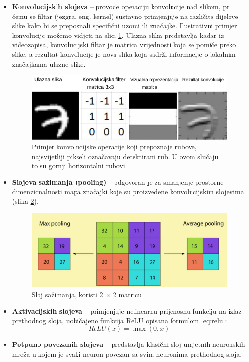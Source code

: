 \documentclass[zavrsnirad]{fer}
\begin{document}
\begin{itemize}
  \item \textbf{Konvolucijskih slojeva} – provode operaciju konvolucije nad slikom, pri čemu se filtar (jezgra, eng. kernel) sustavno primjenjuje na različite dijelove slike kako bi se prepoznali specifični uzorci ili značajke. Ilustrativni primjer konvolucije možemo vidjeti na slici \ref{fig:cnn}. 
Ulazna slika predstavlja kadar iz videozapisa, konvolucijski filtar je matrica vrijednosti koja se pomiče preko slike, a rezultat konvolucije je nova slika koja sadrži informacije o lokalnim značajkama ulazne slike.
  \begin{figure}[H]
    \centering
    \includegraphics[width=\textwidth]{Figures/convolution.png}
    \caption{Primjer konvolucijske operacije koji prepoznaje rubove, najsvijetliji pikseli označavaju detektirani rub. U ovom slučaju to su gornji horizontalni rubovi \cite{deeplizard_cnn}}
    \label{fig:cnn}
  \end{figure}
  \item \textbf{Slojeva sažimanja (pooling)} – odgovoran je za smanjenje prostorne dimenzionalnosti mapa značajki koje su proizvedene konvolucijskim slojevima (slika \ref{fig:pooling}).
  \begin{figure}[H]
    \centering
    \includegraphics[width=\textwidth]{Figures/pooling.png}
    \caption{Sloj sažimanja, koristi 2 × 2 matricu \cite{haque2023cnn}}
    \label{fig:pooling}
  \end{figure}
  \item \textbf{Aktivacijskih slojeva} – primjenjuje nelinearnu prijenosnu funkciju na izlaz prethodnog sloja, uobičajeno funkcija ReLU opisana formulom \ref{eq:relu}:
  \begin{equation}
    \label{eq:relu}
    ReLU(x) = \max(0, x)
  \end{equation}
  \item \textbf{Potpuno povezanih slojeva} – predstavlja klasični sloj umjetnih neuronskih mreža u kojem je svaki neuron povezan sa svim neuronima prethodnog sloja.
\end{itemize}
\end{document}
